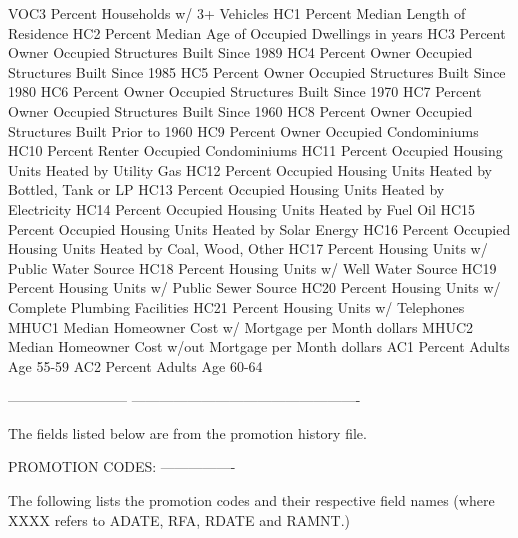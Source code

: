 \documentclass[
  11pt,
  a4paper,
  DIV=12,captions=tableheading,oneside,titlepage]{scrbook}
\let\oldverbatim\verbatim
\let\endoldverbatim\endverbatim
\renewenvironment{verbatim}{\footnotesize\oldverbatim}{\endoldverbatim}
\begin{document}
\begin{verbatim}
VOC3                        Percent Households w/ 3+ Vehicles
HC1                         Percent Median Length of Residence
HC2                         Percent Median Age of Occupied Dwellings in years
HC3                         Percent Owner Occupied Structures Built Since 1989
HC4                         Percent Owner Occupied Structures Built Since 1985
HC5                         Percent Owner Occupied Structures Built Since 1980
HC6                         Percent Owner Occupied Structures Built Since 1970
HC7                         Percent Owner Occupied Structures Built Since 1960
HC8                         Percent Owner Occupied Structures Built Prior to 1960
HC9                         Percent Owner Occupied Condominiums
HC10                        Percent Renter Occupied Condominiums
HC11                        Percent Occupied Housing Units Heated by Utility Gas
HC12                        Percent Occupied Housing Units Heated by Bottled, Tank or LP
HC13                        Percent Occupied Housing Units Heated by Electricity
HC14                        Percent Occupied Housing Units Heated by Fuel Oil
HC15                        Percent Occupied Housing Units Heated by Solar Energy
HC16                        Percent Occupied Housing Units Heated by Coal, Wood, Other
HC17                        Percent Housing Units w/ Public Water Source
HC18                        Percent Housing Units w/ Well Water Source
HC19                        Percent Housing Units w/ Public Sewer Source
HC20                        Percent Housing Units w/ Complete Plumbing Facilities
HC21                        Percent Housing Units w/ Telephones
MHUC1                       Median Homeowner Cost w/ Mortgage per Month dollars
MHUC2                       Median Homeowner Cost w/out Mortgage per Month dollars
AC1                         Percent Adults Age 55-59
AC2                         Percent Adults Age 60-64
                           
--------------------------  -------------------------------------------------
                      
                            The fields listed below are from the promotion history file.  

                            PROMOTION CODES: 
                            ----------------

                            The following lists the promotion codes and their 
                            respective field names (where XXXX refers to ADATE, RFA, 
                            RDATE and RAMNT.) 
                            

\end{verbatim}
\end{document}
